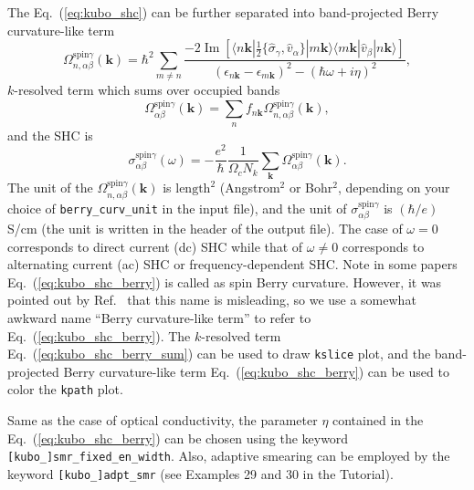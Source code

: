 The Eq.~(\ref{eq:kubo_shc}) can be further separated into 
band-projected Berry curvature-like term
\begin{equation}
\label{eq:kubo_shc_berry}
\Omega_{n,\alpha\beta}^{\text{spin}\gamma}(\bm{k}) = {\hbar}^2 \sum_{
	m\ne n}\frac{-2\operatorname{Im}[\langle n\bm{k}| 
	\frac{1}{2}\{\hat{\sigma}_{\gamma},\hat{v}_{\alpha}\}|m\bm{k}\rangle
	\langle m\bm{k}| \hat{v}_{\beta}|n\bm{k}\rangle]}
{(\epsilon_{n\bm{k}}-\epsilon_{m\bm{k}})^2-(\hbar\omega+i\eta)^2},
\end{equation}
$k$-resolved term which sums over occupied bands
\begin{equation}
\label{eq:kubo_shc_berry_sum}
\Omega_{\alpha\beta}^{\text{spin}\gamma}(\bm{k}) = \sum_{n}
f_{n\bm{k}} \Omega_{n,\alpha\beta}^{\text{spin}\gamma}(\bm{k}),
\end{equation}
and the SHC is 
\begin{equation}
\sigma_{\alpha\beta}^{\text{spin}\gamma}(\omega) = 
-\frac{e^2}{\hbar}\frac{1}{\Omega_c N_k}\sum_{\bm{k}}
\Omega_{\alpha\beta}^{\text{spin}\gamma}(\bm{k}).
\end{equation}
The unit of the $\Omega_{n,\alpha\beta}^{\text{spin}\gamma}(\bm{k})$ 
is $\text{length}^{2}$ (Angstrom$^2$ or Bohr$^2$, depending on your 
choice of {\tt berry\_curv\_unit} in the input file), 
and the unit of  $\sigma_{\alpha\beta}^{\text{spin}\gamma}$ 
is $(\hbar/e)$S/cm (the unit is written in the header of the output file). 
The case of $\omega=0$ corresponds to 
direct current (dc) SHC while that of $\omega\ne0$ 
corresponds to alternating current (ac) SHC or frequency-dependent SHC. 
Note in some papers Eq.~(\ref{eq:kubo_shc_berry}) is called as 
spin Berry curvature. However, it was pointed out by 
Ref.~\cite{Gradhand_2012} that this 
name is misleading, so we use a somewhat awkward name 
``Berry curvature-like term'' to refer to Eq.~(\ref{eq:kubo_shc_berry}). 
The $k$-resolved term Eq.~(\ref{eq:kubo_shc_berry_sum}) can be 
used to draw {\tt kslice} plot, and the band-projected Berry curvature-like term 
Eq.~(\ref{eq:kubo_shc_berry})
can be used to color the {\tt kpath} plot. 

Same as the case of optical conductivity, the parameter
$\eta$ contained in the Eq.~(\ref{eq:kubo_shc_berry}) can be chosen using the keyword {\tt[kubo\_]smr\_fixed\_en\_width}. Also, adaptive smearing can 
be employed by the keyword {\tt [kubo\_]adpt\_smr} 
(see Examples 29 and 30 in the Tutorial). 

